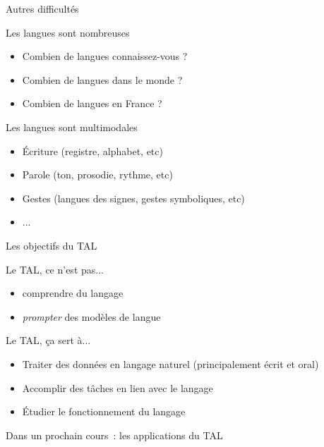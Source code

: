 \documentclass[serif, aspectratio=169]{beamer}
\begin{document}
\begin{frame}{Autres difficultés}
    \begin{block}{Les langues sont nombreuses}
        \begin{itemize}
            \pause
            \item Combien de langues connaissez-vous ?
            \pause
            \item Combien de langues dans le monde ? %
            \pause
            \item Combien de langues en France ? %
        \end{itemize}
    \end{block}
    \pause
    \begin{block}{Les langues sont multimodales}
       \begin{itemize}
            \pause
            \item Écriture (registre, alphabet, etc)
            \pause
            \item Parole (ton, prosodie, rythme, etc)
            \pause
            \item Gestes (langues des signes, gestes symboliques, etc)
            \item ...
        \end{itemize} 
    \end{block}
\end{frame}

\begin{frame}{Les objectifs du TAL}
    \begin{block}{Le TAL, ce n'est pas...}
        \pause
        \begin{itemize}
            \item comprendre du langage
            \item \textit{prompter} des modèles de langue
        \end{itemize}
    \end{block}
    \pause
    \begin{block}{Le TAL, ça sert à...}
        \pause
        \begin{itemize}
            \item Traiter des données en langage naturel (principalement écrit et oral)
            \item Accomplir des tâches en lien avec le langage
            \item Étudier le fonctionnement du langage
        \end{itemize}
    \end{block}
    \pauses
    \begin{center}
        \Large
        Dans un prochain cours~: les applications du TAL
    \end{center}
\end{frame}
\end{document}
